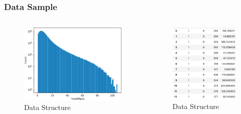 \documentclass{beamer}
\begin{document}
\begin{frame}
\frametitle{Data Sample}
\begin{columns}
\begin{figure}
    \centering
    \caption{Data Structure}
    \includegraphics[width=1.0\linewidth]{img/pepos.png}
\end{figure}
\begin{figure}
    \centering
    \caption{Data Structure}
    \includegraphics[width=1.0\linewidth]{img/dataset.png}
\end{figure}
\end{columns}
\end{frame}
\end{document}
